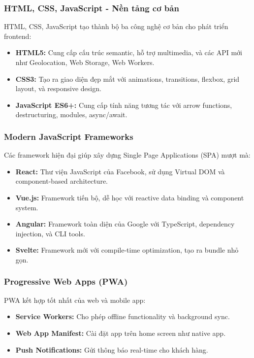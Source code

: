 \documentclass[a4paper,12pt]{report}
\begin{document}
\subsubsection{HTML, CSS, JavaScript - Nền tảng cơ bản}
HTML, CSS, JavaScript tạo thành bộ ba công nghệ cơ bản cho phát triển frontend:
\begin{itemize}
    \item \textbf{HTML5:} Cung cấp cấu trúc semantic, hỗ trợ multimedia, và các API mới như Geolocation, Web Storage, Web Workers.
    \item \textbf{CSS3:} Tạo ra giao diện đẹp mắt với animations, transitions, flexbox, grid layout, và responsive design.
    \item \textbf{JavaScript ES6+:} Cung cấp tính năng tương tác với arrow functions, destructuring, modules, async/await.
\end{itemize}

\subsubsection{Modern JavaScript Frameworks}
Các framework hiện đại giúp xây dựng Single Page Applications (SPA) mượt mà:
\begin{itemize}
    \item \textbf{React:} Thư viện JavaScript của Facebook, sử dụng Virtual DOM và component-based architecture.
    \item \textbf{Vue.js:} Framework tiến bộ, dễ học với reactive data binding và component system.
    \item \textbf{Angular:} Framework toàn diện của Google với TypeScript, dependency injection, và CLI tools.
    \item \textbf{Svelte:} Framework mới với compile-time optimization, tạo ra bundle nhỏ gọn.
\end{itemize}

\subsubsection{Progressive Web Apps (PWA)}
PWA kết hợp tốt nhất của web và mobile app:
\begin{itemize}
    \item \textbf{Service Workers:} Cho phép offline functionality và background sync.
    \item \textbf{Web App Manifest:} Cài đặt app trên home screen như native app.
    \item \textbf{Push Notifications:} Gửi thông báo real-time cho khách hàng.
\end{itemize}
\end{document}
